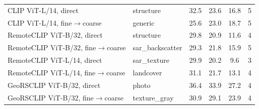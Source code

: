 \begin{table}[t]
\begin{tabular*}{\hsize}{@{\extracolsep{\fill}}llcccc@{}}
CLIP ViT-L/14, direct & structure & 32.5 & 23.6 & 16.8 & 5 \\
CLIP ViT-L/14, fine$\to$coarse & generic & 25.6 & 23.0 & 18.7 & 5 \\
RemoteCLIP ViT-B/32, direct & structure & 29.8 & 20.9 & 11.6 & 4 \\
RemoteCLIP ViT-B/32, fine$\to$coarse & sar\_backscatter & 29.3 & 21.8 & 15.9 & 5 \\
RemoteCLIP ViT-L/14, direct & sar\_texture & 29.9 & 20.2 & 9.6 & 3 \\
RemoteCLIP ViT-L/14, fine$\to$coarse & landcover & 31.1 & 21.7 & 13.1 & 4 \\
GeoRSCLIP ViT-B/32, direct & photo & 36.4 & 33.9 & 27.2 & 4 \\
GeoRSCLIP ViT-B/32, fine$\to$coarse & texture\_gray & 30.9 & 29.1 & 23.9 & 4 \\
\bottomrule
\end{tabular*}
\end{table}
